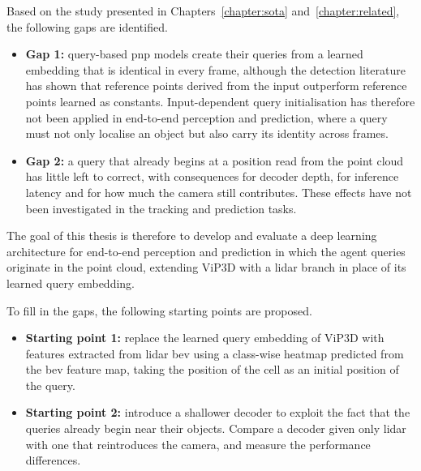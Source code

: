 

Based on the study presented in Chapters~\ref{chapter:sota} and~\ref{chapter:related}, the
following gaps are identified.
\begin{itemize}
    \item \textbf{Gap 1:} query-based \ac{pnp} models create their queries from a learned embedding that is
          identical in every frame, although the detection literature has shown that reference points
          derived from the input outperform reference points learned as constants. Input-dependent
          query initialisation has therefore not been applied in end-to-end perception and
          prediction, where a query must not only localise an object but also carry its identity
          across frames.
      \item \textbf{Gap 2:} a query that already begins at a position read from the point cloud has little left to correct,
      with consequences for decoder depth, for inference latency and for how much the camera still contributes. 
      These effects have not been investigated in the tracking and prediction tasks.
\end{itemize}

The goal of this thesis is therefore to develop and evaluate a deep learning architecture for end-to-end perception and
prediction in which the agent queries originate in the point cloud, extending ViP3D with a \ac{lidar}
branch in place of its learned query embedding.

To fill in the gaps, the following starting points are proposed.
\begin{itemize}
    \item \textbf{Starting point 1:} replace the learned query embedding of ViP3D with features extracted from \ac{lidar} \ac{bev} using a class-wise heatmap
    predicted from the \ac{bev} feature map, taking the position of the cell as an initial position of the query. 
    \item \textbf{Starting point 2:} introduce a shallower decoder to exploit the fact that the queries already begin near their objects. Compare a decoder given only \ac{lidar} with one that reintroduces the camera, and measure the performance differences.
\end{itemize}
